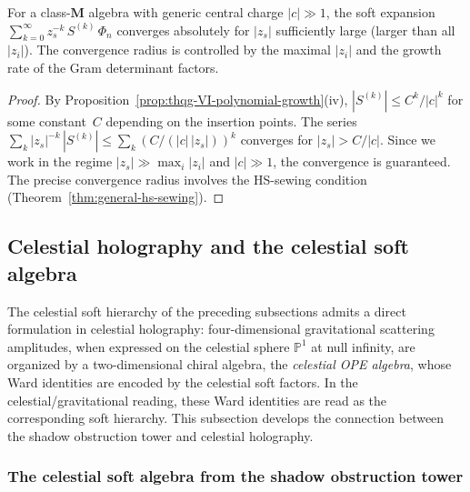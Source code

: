 \begin{corollary}
\label{cor:thqg-VI-soft-convergence}
For a class-$\mathbf{M}$ algebra with generic central charge
$|c| \gg 1$, the soft expansion
$\sum_{k=0}^{\infty} z_s^{-k}\,S^{(k)}\,\Phi_n$
converges absolutely for $|z_s|$ sufficiently large (larger than
all $|z_i|$). The convergence radius is controlled by the
maximal $|z_i|$ and the growth rate of the Gram determinant
factors.
\end{corollary}

\begin{proof}
By Proposition~\ref{prop:thqg-VI-polynomial-growth}(iv),
$|S^{(k)}| \leq C^k / |c|^k$ for some constant~$C$ depending on
the insertion points. The series
$\sum_k |z_s|^{-k}\,|S^{(k)}| \leq \sum_k (C/(|c|\,|z_s|))^k$
converges for $|z_s| > C/|c|$. Since we work in the regime
$|z_s| \gg \max_i |z_i|$ and $|c| \gg 1$, the convergence is
guaranteed. The precise convergence radius involves the HS-sewing
condition (Theorem~\ref{thm:general-hs-sewing}).
\end{proof}

%
%

\subsection{Celestial holography and the celestial soft algebra}
\label{subsec:thqg-VI-celestial}

The celestial soft hierarchy of the preceding subsections admits a
direct formulation in celestial holography:
four-dimensional gravitational scattering amplitudes, when
expressed on the celestial sphere $\mathbb{P}^1$ at null infinity,
are organized by a two-dimensional chiral algebra, the
\emph{celestial OPE algebra}, whose Ward identities are encoded by the
celestial soft factors. In the celestial/gravitational reading, these Ward
identities are read as the corresponding soft hierarchy.
This subsection
develops the connection between the shadow obstruction tower and celestial
holography.

\subsubsection{The celestial soft algebra from the shadow obstruction tower}

